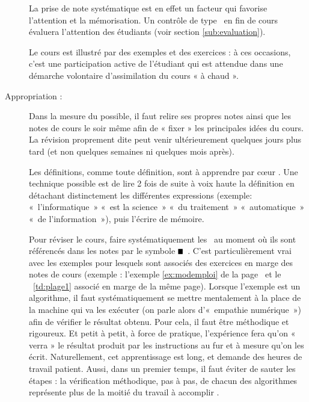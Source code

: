 \begin{description}
	
	La prise de note systématique est en effet un facteur qui favorise l'attention et la mémorisation.
	Un contrôle de type \qcm\ en fin de cours évaluera l'attention
	des étudiants (voir section \ref{sub:evaluation}). 

	Le cours est illustré par des exemples et des exercices : à ces occasions, 
	c'est une participation active de l'étudiant qui est attendue dans une
	démarche volontaire d'assimilation du cours « à chaud ».
	
\item[Appropriation :]  
	Dans la mesure du possible, il faut relire ses propres notes 
	ainsi que les notes de cours le soir même afin de « fixer » les principales
	idées du cours. La révision proprement dite peut venir ultérieurement
	quelques jours plus tard (et non quelques semaines ni quelques mois après).
	
	Les définitions, comme toute définition, sont à apprendre par c\oe ur
	\label{parcoeur}.
	Une technique possible est de lire 2 fois de suite à voix haute la définition
	en détachant distinctement les différentes expressions (exemple: «~l'informatique~»
	«~est la science~» «~du traitement~» «~automatique~» «~de l'information~»),
	puis l'écrire de mémoire.
	
	Pour réviser le cours, faire systématiquement les \tdir\ au moment où ils sont
	référencés dans les notes par le symbole {\color{blue}$\rule{2mm}{2mm}\,$}
	\label{appropriation}. 
	C'est particulièrement vrai 
	avec les exemples pour lesquels sont associés des exercices en marge des
	notes de cours
	(exemple : l'exemple \ref{ex:modemploi} de la page~\pageref{ex:modemploi}
	et le \tdir\ \ref {td:plage1} associé en marge de la même page).
	Lorsque l'exemple est un algorithme, il faut  systématiquement se mettre 
	mentalement à la place de la machine qui va les exécuter (on parle alors 
	d'«~empathie numérique~») afin de vérifier le résultat obtenu. 
	Pour cela, il faut être méthodique et rigoureux. 
	Et petit à petit, à force de pratique, l'expérience fera qu'on « verra » 
	le résultat produit par les instructions au fur et à mesure qu'on les écrit. 
	Naturellement, cet apprentissage est long, et demande des heures de travail 
	patient. Aussi, dans un premier temps, il faut éviter de sauter les étapes : 
	la vérification méthodique, pas à pas, de chacun des algorithmes 
	représente plus de la moitié du travail à accomplir 
	\cite{darmengeat}\label{cite:darmengeat}.
\end{description}

